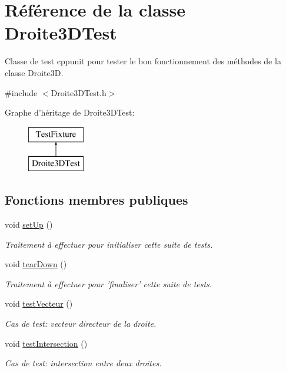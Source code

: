 \hypertarget{class_droite3_d_test}{\section{Référence de la classe Droite3\-D\-Test}
\label{class_droite3_d_test}
}


Classe de test cppunit pour tester le bon fonctionnement des méthodes de la classe Droite3\-D.  




{\ttfamily \#include $<$Droite3\-D\-Test.\-h$>$}

Graphe d'héritage de Droite3\-D\-Test\-:\begin{figure}[H]
\begin{center}
\leavevmode
\includegraphics[height=2.000000cm]{class_droite3_d_test}
\end{center}
\end{figure}
\subsection*{Fonctions membres publiques}
\begin{DoxyCompactItemize}
\item 
void \hyperlink{group__inf2990_ga2058c915e823fa8ab26bad2c22554565}{set\-Up} ()
\begin{DoxyCompactList}\small\item\em Traitement à effectuer pour initialiser cette suite de tests. \end{DoxyCompactList}\item 
void \hyperlink{group__inf2990_gac9305147cf292b41834fabd24e57b976}{tear\-Down} ()
\begin{DoxyCompactList}\small\item\em Traitement à effectuer pour 'finaliser' cette suite de tests. \end{DoxyCompactList}\item 
void \hyperlink{group__inf2990_gaeae69515feaa3c448b7489289910c467}{test\-Vecteur} ()
\begin{DoxyCompactList}\small\item\em Cas de test\-: vecteur directeur de la droite. \end{DoxyCompactList}\item 
void \hyperlink{group__inf2990_gaa99e4b9c5f0916cef3b8dfe7ab8a4e9d}{test\-Intersection} ()
\begin{DoxyCompactList}\small\item\em Cas de test\-: intersection entre deux droites. \end{DoxyCompactList}\end{DoxyCompactItemize}


